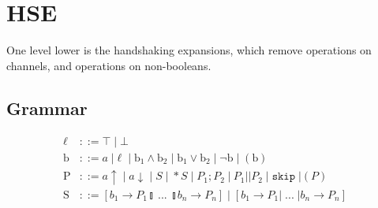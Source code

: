 \documentclass[times,10pt]{article}
\begin{document}
%

\section{HSE}

One level lower is the handshaking expansions, which remove operations on channels, and operations on non-booleans.

\subsection{Grammar}

\begin{align*}
\ell & ::= \top \; | \perp \\
\mathrm{b} & ::= a \; | \ell \; | \; \mathrm{b}_1 \wedge \mathrm{b}_2 \; | \; \mathrm{b}_1 \vee \mathrm{b}_2 \; | \; \lnot \mathrm{b} \; | \; ( \mathrm{b} ) \\
\mathrm{P} & ::= a\uparrow \; | \; a\downarrow \; | \; S \; | \; *S \; | \; P_1; P_2 \; | \: P_1 || P_2 \; | \; \mathtt{skip} \; | ( P )  \\
\mathrm{S} & ::= [ b_1 \rightarrow P_1  \talloblong \; ... \; \talloblong b_n \rightarrow P_n ] \; | \; [ b_1 \rightarrow P_1 | \; ... \; | b_n \rightarrow P_n ]
\end{align*}
\end{document}
